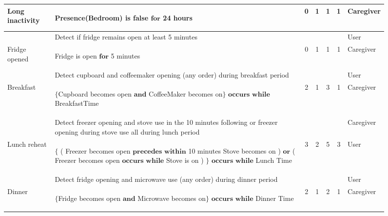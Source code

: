 \begin{figure*}[h]
\begin{tabular}{|p{1.45cm}|p{8cm}|c|c|c|c|p{1.65cm}|}
    Long inactivity & \begin{mtext}
      Presence(Bedroom) is false $\textbf{for}$ 24 hours
    \end{mtext} & 0 & 1 & 1 & 1& Caregiver \\                              
    \hline
    &\cellcolor{gray!15} Detect if fridge remains open at least 5 minutes & & & & & User\\%
    Fridge opened & \begin{mtext} 
      Fridge is open $\textbf{for}$ 5 minutes
    \end{mtext}& 0 & 1 & 1 & 1 & Caregiver \\
    \hline
     &\cellcolor{gray!15} Detect cupboard and coffeemaker opening (any order) during breakfast period &&&&& User\\%
                                 Breakfast &  \begin{mtext} 
                                    $\textbf{\{}$Cupboard becomes open $\textbf{and}$ CoffeeMaker becomes on$\textbf{\}}$ $\textbf{occurs}$ $\textbf{while}$ BreakfastTime 
                                  \end{mtext} &2 &1 &3 &1& Caregiver \\
    \hline
     &\cellcolor{gray!15} Detect freezer opening and stove use in the 10 minutes following or freezer opening during stove use all during lunch period & & & & & Caregiver \\ %
     Lunch reheat& \begin{mtext}  
      $\textbf{\{}$ ( Freezer becomes open $\textbf{precedes}$ $\textbf{within}$ 10 minutes Stove becomes on ) $\textbf{or}$ ( Freezer becomes open $\textbf{occurs}$ $\textbf{while}$ Stove is on ) $\textbf{\}}$ $\textbf{occurs}$ $\textbf{while}$ Lunch Time
    \end{mtext}&3 &2 &5 &3 &User \\                              
    \hline
     & \cellcolor{gray!15} Detect fridge opening and microwave use (any order) during dinner period & & & & & User\\ %
    Dinner& \begin{mtext}  
      $\textbf{\{}$Fridge becomes open $\textbf{and}$ Microwave becomes on$\textbf{\}}$ $\textbf{occurs}$ $\textbf{while}$ Dinner Time
    \end{mtext} & 2& 1& 2&1& Caregiver \\

\end{tabular}
\end{figure*}
